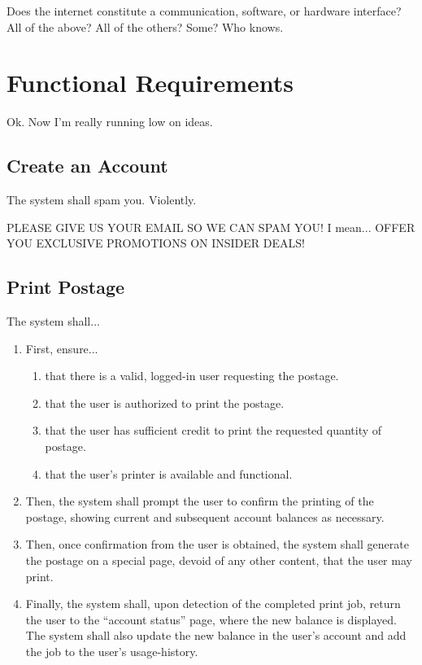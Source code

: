 \documentclass{scrreprt}
\begin{document}
Does the internet constitute a communication, software, or hardware 
interface? All of the above? All of the others? Some? Who knows.

\section{Functional Requirements}

Ok. Now I'm really running low on ideas.

\subsection{Create an Account}

The system shall spam you. Violently.

PLEASE GIVE US YOUR EMAIL SO WE CAN SPAM YOU! I mean... 
OFFER YOU EXCLUSIVE PROMOTIONS ON INSIDER DEALS!

\subsection{Print Postage}

The system shall...

\begin{enumerate}
\item First, ensure...
\begin{enumerate}
\item that there is a valid, logged-in user requesting the postage.
\item that the user is authorized to print the postage.
\item that the user has sufficient credit to print the requested quantity of 
postage.
\item that the user's printer is available and functional.
\end{enumerate}
\item Then, the system shall prompt the user to confirm the printing of the 
postage, showing current and subsequent account balances as necessary.
\item Then, once confirmation from the user is obtained, the system shall 
generate the postage on a special page, devoid of any other content, that the 
user may print.
\item Finally, the system shall, upon detection of the completed print job, 
return the user to the ``account status'' page, where the new balance is 
displayed. The system shall also update the new balance in the user's account 
and add the job to the user's usage-history.
\end{enumerate}
\end{document}
